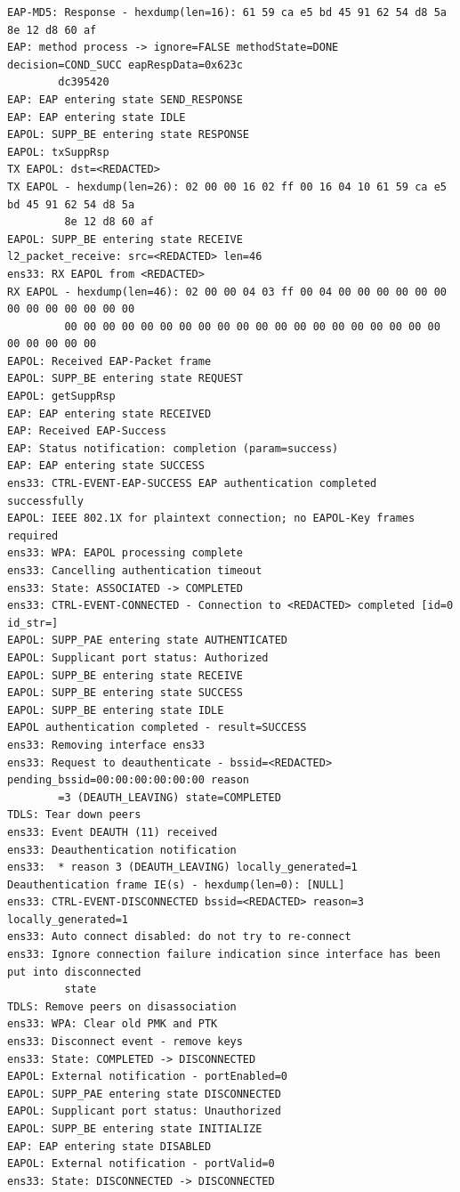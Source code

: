 \documentclass[11pt]{article}
\begin{document}
\begin{verbatim}
EAP-MD5: Response - hexdump(len=16): 61 59 ca e5 bd 45 91 62 54 d8 5a 8e 12 d8 60 af
EAP: method process -> ignore=FALSE methodState=DONE decision=COND_SUCC eapRespData=0x623c
        dc395420
EAP: EAP entering state SEND_RESPONSE
EAP: EAP entering state IDLE
EAPOL: SUPP_BE entering state RESPONSE
EAPOL: txSuppRsp
TX EAPOL: dst=<REDACTED>
TX EAPOL - hexdump(len=26): 02 00 00 16 02 ff 00 16 04 10 61 59 ca e5 bd 45 91 62 54 d8 5a
         8e 12 d8 60 af
EAPOL: SUPP_BE entering state RECEIVE
l2_packet_receive: src=<REDACTED> len=46
ens33: RX EAPOL from <REDACTED>
RX EAPOL - hexdump(len=46): 02 00 00 04 03 ff 00 04 00 00 00 00 00 00 00 00 00 00 00 00 00
         00 00 00 00 00 00 00 00 00 00 00 00 00 00 00 00 00 00 00 00 00 00 00 00 00
EAPOL: Received EAP-Packet frame
EAPOL: SUPP_BE entering state REQUEST
EAPOL: getSuppRsp
EAP: EAP entering state RECEIVED
EAP: Received EAP-Success
EAP: Status notification: completion (param=success)
EAP: EAP entering state SUCCESS
ens33: CTRL-EVENT-EAP-SUCCESS EAP authentication completed successfully
EAPOL: IEEE 802.1X for plaintext connection; no EAPOL-Key frames required
ens33: WPA: EAPOL processing complete
ens33: Cancelling authentication timeout
ens33: State: ASSOCIATED -> COMPLETED
ens33: CTRL-EVENT-CONNECTED - Connection to <REDACTED> completed [id=0 id_str=]
EAPOL: SUPP_PAE entering state AUTHENTICATED
EAPOL: Supplicant port status: Authorized
EAPOL: SUPP_BE entering state RECEIVE
EAPOL: SUPP_BE entering state SUCCESS
EAPOL: SUPP_BE entering state IDLE
EAPOL authentication completed - result=SUCCESS
ens33: Removing interface ens33
ens33: Request to deauthenticate - bssid=<REDACTED> pending_bssid=00:00:00:00:00:00 reason
        =3 (DEAUTH_LEAVING) state=COMPLETED
TDLS: Tear down peers
ens33: Event DEAUTH (11) received
ens33: Deauthentication notification
ens33:  * reason 3 (DEAUTH_LEAVING) locally_generated=1
Deauthentication frame IE(s) - hexdump(len=0): [NULL]
ens33: CTRL-EVENT-DISCONNECTED bssid=<REDACTED> reason=3 locally_generated=1
ens33: Auto connect disabled: do not try to re-connect
ens33: Ignore connection failure indication since interface has been put into disconnected
         state
TDLS: Remove peers on disassociation
ens33: WPA: Clear old PMK and PTK
ens33: Disconnect event - remove keys
ens33: State: COMPLETED -> DISCONNECTED
EAPOL: External notification - portEnabled=0
EAPOL: SUPP_PAE entering state DISCONNECTED
EAPOL: Supplicant port status: Unauthorized
EAPOL: SUPP_BE entering state INITIALIZE
EAP: EAP entering state DISABLED
EAPOL: External notification - portValid=0
ens33: State: DISCONNECTED -> DISCONNECTED

\end{verbatim}
\end{document}
